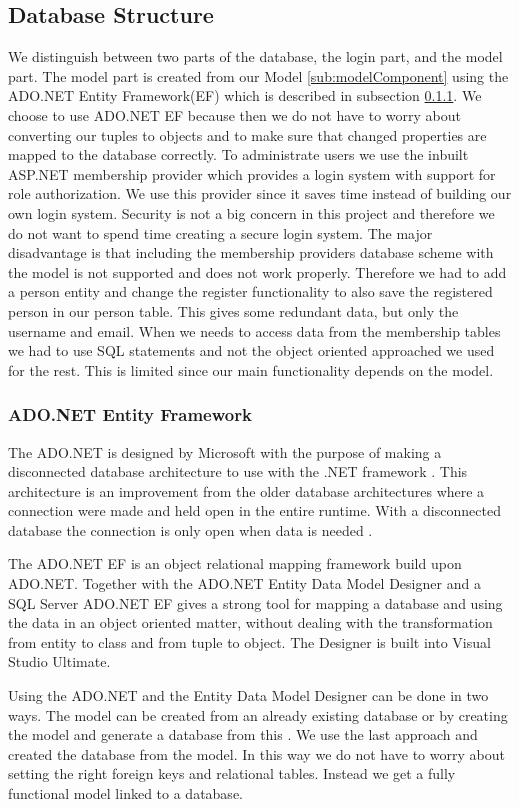\subsection{Database Structure}
\label{sec:databasestructure}

We distinguish between two parts of the database, the login part, and the model part. 
The model part is created from our Model \ref{sub:modelComponent} using the ADO.NET Entity Framework(EF) which is described in subsection \ref{sub:adonet}. 
We choose to use ADO.NET EF because then we do not have to worry about converting our tuples to objects and to make sure that changed properties are mapped to the database correctly.  
To administrate users we use the inbuilt ASP.NET membership provider which provides a login system with support for role authorization. 
We use this provider since it saves time instead of building our own login system. 
Security is not a big concern in this project and therefore we do not want to spend time creating a secure login system. 
The major disadvantage is that including the membership providers database scheme with the model is not supported and does not work properly. 
Therefore we had to add a person entity and change the register functionality to also save the registered person in our person table. 
This gives some redundant data, but only the username and email. 
When we needs to access data from the membership tables we had to use SQL statements and not the object oriented approached we used for the rest. 
This is limited since our main functionality depends on the model. 

\subsubsection{ADO.NET Entity Framework}
\label{sub:adonet}
The ADO.NET is designed by Microsoft with the purpose of making a disconnected database architecture to use with the .NET framework \cite{adonetDesignGoal}. 
This architecture is an improvement from the older database architectures where a connection were made and held open in the entire runtime. With a disconnected database the connection is only open when data is needed \cite{disconnectedData}. 

The ADO.NET EF is an object relational mapping framework \cite{adonetEntityFramework} build upon ADO.NET. 
Together with the ADO.NET Entity Data Model Designer and a SQL Server ADO.NET EF gives a strong tool for mapping a database and using the data in an object oriented matter, without dealing with the transformation from entity to class and from tuple to object. 
The Designer is built into Visual Studio Ultimate. 

Using the ADO.NET and the Entity Data Model Designer can be done in two ways. 
The model can be created from an already existing database or by creating the model and generate a database from this \cite{adonetEntityDataModelDesigner}.
We use the last approach and created the database from the model. 
In this way we do not have to worry about setting the right foreign keys and relational tables. Instead we get a fully functional model linked to a database. 


